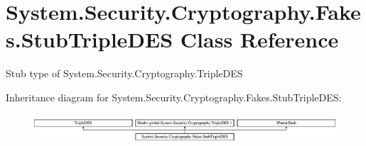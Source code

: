 \hypertarget{class_system_1_1_security_1_1_cryptography_1_1_fakes_1_1_stub_triple_d_e_s}{\section{System.\-Security.\-Cryptography.\-Fakes.\-Stub\-Triple\-D\-E\-S Class Reference}
\label{class_system_1_1_security_1_1_cryptography_1_1_fakes_1_1_stub_triple_d_e_s}
}


Stub type of System.\-Security.\-Cryptography.\-Triple\-D\-E\-S 


Inheritance diagram for System.\-Security.\-Cryptography.\-Fakes.\-Stub\-Triple\-D\-E\-S\-:\begin{figure}[H]
\begin{center}
\leavevmode
\includegraphics[height=1.085271cm]{class_system_1_1_security_1_1_cryptography_1_1_fakes_1_1_stub_triple_d_e_s}
\end{center}
\end{figure}
